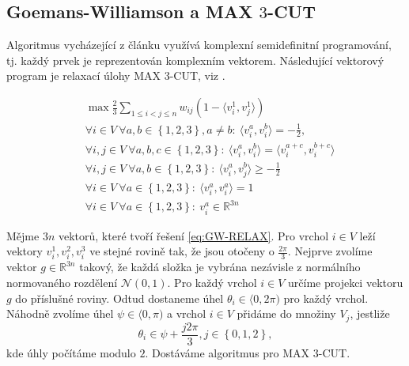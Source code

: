 \subsection{Goemans-Williamson a MAX $3$-CUT}

Algoritmus vycházející z článku \cite{complex-max-3-cut} využívá komplexní semidefinitní programování, tj. každý prvek je reprezentován komplexním vektorem. Následující vektorový program je relaxací úlohy MAX $3$-CUT, viz \cite{newman}. 

\begin{equation}\tag{GW-RELAX}
    \begin{split}
        &\max \frac{2}{3} \sum_{1 \leq i < j \leq n} w_{ij} (1 - \langle v_i^1, v_j^1 \rangle) \\
        &\forall i \in V\ \forall a,b \in \left\{ 1,2,3 \right\}, a \neq b:\ \langle v_i^a, v_i^b \rangle = -\frac{1}{2}, \\
        &\forall i,j \in V\ \forall a,b,c \in \left\{ 1,2,3 \right\}:\ \langle v_i^a, v_i^b \rangle = \langle v_i^{a+c}, v_i^{b+c} \rangle \\
        &\forall i,j \in V\ \forall a,b \in \left\{ 1,2,3 \right\}:\ \langle v_i^a, v_j^b \rangle \geq -\frac{1}{2} \\
        &\forall i \in V\ \forall a \in \left\{ 1,2,3 \right\}:\ \langle v_i^a, v_i^a \rangle = 1 \\
        &\forall i \in V\ \forall a \in \left\{ 1,2,3 \right\}:\ v_i^a \in \mathbb{R}^{3n}
    \end{split}
    \label{eq:GW-RELAX}
\end{equation}


Mějme $3n$ vektorů, které tvoří řešení \ref{eq:GW-RELAX}. Pro vrchol $i \in V$ leží vektory $v_i^1, v_i^2, v_i^3$ ve stejné rovině tak, že jsou otočeny o $\frac{2\pi}{3}$. Nejprve zvolíme vektor $g \in \mathbb{R}^{3n}$ takový, že každá složka je vybrána nezávisle z normálního normovaného rozdělení $\mathcal{N}(0,1)$. Pro každý vrchol $i \in V$ určíme projekci vektoru $g$ do příslušné roviny. Odtud dostaneme úhel $\theta_i \in \langle 0, 2\pi)$ pro každý vrchol. Náhodně zvolíme úhel $\psi \in \langle 0, \pi)$ a vrchol $i \in V$ přidáme do množiny $V_j$, jestliže
$$
    \theta_i \in \psi + \frac{j 2 \pi}{3}, j \in \left\{ 0, 1, 2 \right\},
$$
kde úhly počítáme modulo $2$. Dostáváme algoritmus pro MAX $3$-CUT.

